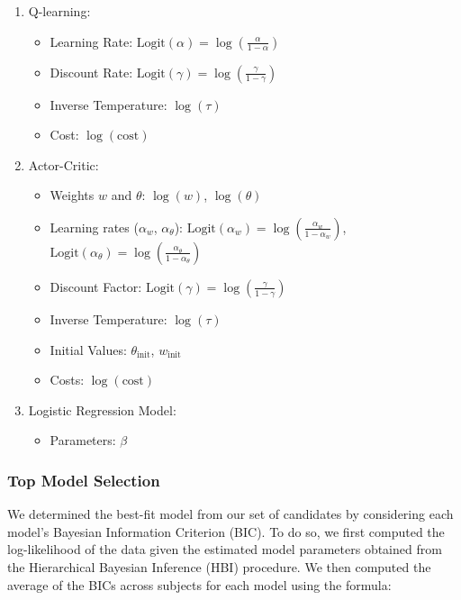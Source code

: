 \documentclass[
  number,
  preprint,
  3p,
  onecolumn]{elsarticle}
\providecommand{\tightlist}{%
  \setlength{\itemsep}{0pt}\setlength{\parskip}{0pt}}\usepackage{longtable,booktabs,array}
\begin{document}
\begin{enumerate}
\def\labelenumi{\arabic{enumi}.}
\tightlist
\item
  Q-learning:

  \begin{itemize}
  \tightlist
  \item
    Learning Rate:
    \(\text{Logit}(\alpha)=\log(\frac{\alpha}{1-\alpha})\)
  \item
    Discount Rate:
    \(\text{Logit}(\gamma)=\log(\frac{\gamma}{1-\gamma})\)
  \item
    Inverse Temperature: \(\log(\tau)\)
  \item
    Cost: \(\log(\text{cost})\)
  \end{itemize}
\item
  Actor-Critic:

  \begin{itemize}
  \tightlist
  \item
    Weights \(w\) and \(\theta\): \(\log(w)\), \(\log(\theta)\)
  \item
    Learning rates (\(\alpha_w\), \(\alpha_\theta\)):
    \(\text{Logit}(\alpha_w)=\log(\frac{\alpha_w}{1-\alpha_w})\),
    \(\text{Logit}(\alpha_\theta)=\log(\frac{\alpha_\theta}{1-\alpha_\theta})\)
  \item
    Discount Factor:
    \(\text{Logit}(\gamma)=\log(\frac{\gamma}{1-\gamma})\)
  \item
    Inverse Temperature: \(\log(\tau)\)
  \item
    Initial Values: \(\theta_{\text{init}}\), \(w_{\text{init}}\)
  \item
    Costs: \(\log(\text{cost})\)
  \end{itemize}
\item
  Logistic Regression Model:

  \begin{itemize}
  \tightlist
  \item
    Parameters: \(\beta\)
  \end{itemize}
\end{enumerate}

\subsubsection{Top Model Selection}\label{top-model-selection-1}

We determined the best-fit model from our set of candidates by
considering each model's Bayesian Information Criterion (BIC). To do so,
we first computed the log-likelihood of the data given the estimated
model parameters obtained from the Hierarchical Bayesian Inference (HBI)
procedure. We then computed the average of the BICs across subjects for
each model using the formula:
\end{document}
